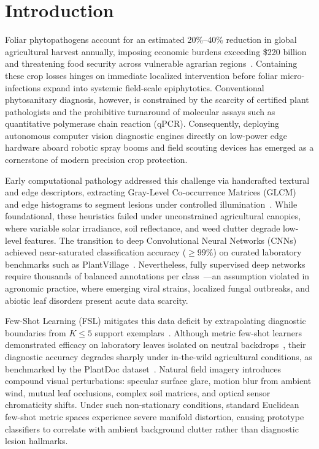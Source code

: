 \section{Introduction}
\label{sec:introduction}

Foliar phytopathogens account for an estimated 20\%--40\% reduction in global agricultural harvest annually, imposing economic burdens exceeding \$220 billion and threatening food security across vulnerable agrarian regions~\cite{strange2005plant, savary2019global}. Containing these crop losses hinges on immediate localized intervention before foliar micro-infections expand into systemic field-scale epiphytotics. Conventional phytosanitary diagnosis, however, is constrained by the scarcity of certified plant pathologists and the prohibitive turnaround of molecular assays such as quantitative polymerase chain reaction (qPCR). Consequently, deploying autonomous computer vision diagnostic engines directly on low-power edge hardware aboard robotic spray booms and field scouting devices has emerged as a cornerstone of modern precision crop protection.

Early computational pathology addressed this challenge via handcrafted textural and edge descriptors, extracting Gray-Level Co-occurrence Matrices (GLCM)~\cite{haralick1973textural} and edge histograms to segment lesions under controlled illumination~\cite{camargo2009image}. While foundational, these heuristics failed under unconstrained agricultural canopies, where variable solar irradiance, soil reflectance, and weed clutter degrade low-level features. The transition to deep Convolutional Neural Networks (CNNs) achieved near-saturated classification accuracy ($\ge 99\%$) on curated laboratory benchmarks such as PlantVillage~\cite{mohanty2016using, hughes2015open}. Nevertheless, fully supervised deep networks require thousands of balanced annotations per class~\cite{singh2016deep}---an assumption violated in agronomic practice, where emerging viral strains, localized fungal outbreaks, and abiotic leaf disorders present acute data scarcity.

Few-Shot Learning (FSL) mitigates this data deficit by extrapolating diagnostic boundaries from $K \le 5$ support exemplars~\cite{vinyals2016matching, snell2017prototypical}. Although metric few-shot learners demonstrated efficacy on laboratory leaves isolated on neutral backdrops~\cite{argueso2020few}, their diagnostic accuracy degrades sharply under in-the-wild agricultural conditions, as benchmarked by the PlantDoc dataset~\cite{singh2020plantdoc}. Natural field imagery introduces compound visual perturbations: specular surface glare, motion blur from ambient wind, mutual leaf occlusions, complex soil matrices, and optical sensor chromaticity shifts. Under such non-stationary conditions, standard Euclidean few-shot metric spaces experience severe manifold distortion, causing prototype classifiers to correlate with ambient background clutter rather than diagnostic lesion hallmarks.

